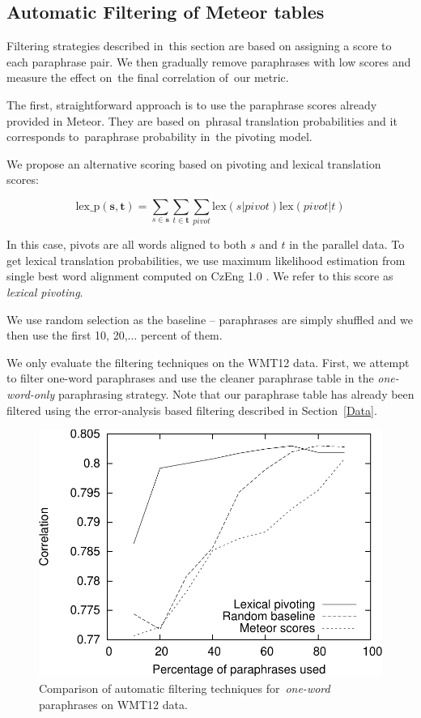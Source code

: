 \documentclass[11pt]{article}
\def\Sref#1{Section~\ref{#1}}
\begin{document}
\subsection*{Automatic Filtering of Meteor tables}
\label{multiword_filtering}
Filtering strategies described in~this section are based on assigning a score 
to each paraphrase pair. We then gradually remove paraphrases with low scores 
and measure the effect on~the final correlation of~our metric.

The first, straightforward approach is to use the paraphrase scores already
provided in Meteor. They are based on~phrasal translation probabilities and it 
corresponds to~paraphrase probability in~the pivoting model.

We propose an alternative scoring based on pivoting and lexical translation
scores:

$$\text{lex\_p}(\mathbf{s},\mathbf{t}) = \sum_{s \in \mathbf{s}}\sum_{t \in
\mathbf{t}}\sum_{pivot}\text{lex}(s|pivot)\text{lex}(pivot|t)$$

In this case, pivots are all words aligned to both $s$ and $t$ in the parallel
data. To get lexical translation probabilities, we use maximum likelihood
estimation from single best word alignment computed on CzEng 1.0
\cite{czeng10:lrec2012}. We refer to this score as \emph{lexical pivoting}.

We use random selection as the baseline -- paraphrases are simply shuffled and 
we then use the first 10, 20,$\ldots$ percent of them.

We only evaluate the filtering techniques on the WMT12 data. First, we attempt
to filter one-word paraphrases and use the cleaner paraphrase table in the
\emph{one-word-only} paraphrasing strategy. Note that our paraphrase table has
already been filtered using the error-analysis based filtering described in 
\Sref{Data}.

\begin{figure}[ht]
\begin{center}
\includegraphics[scale=0.55]{filtering-lexical-cropped.pdf}
\caption{Comparison of automatic filtering techniques for~\emph{one-word} 
paraphrases on WMT12 data.} 
\label{fig:filtering-lexical}
\end{center}
\end{figure}
\end{document}
